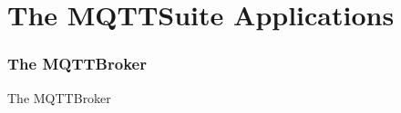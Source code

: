 ﻿\part[withpartpage]{The MQTTSuite Applications}

\section[nosectionpage]{The MQTTBroker}

\begin{frame}{The MQTTBroker}
\end{frame}
